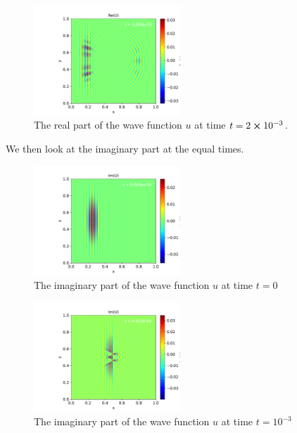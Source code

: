 \documentclass[english,notitlepage,reprint,nofootinbib]{revtex4-2}  %
\begin{document}
	\begin{figure}[h!]
		\centering
		\includegraphics[trim={1cm 0cm 1cm 0cm},clip,width=0.49\textwidth]{figures/problem8_U_Re_0.002.pdf}
		\caption{The real part of the wave function $u$ at time $t = 2\cross10^{-3}$.}
		\label{fig:prob8_Re2}
	\end{figure}
	We then look at the imaginary part at the equal times.
	\begin{figure}[h!]
		\centering
		\includegraphics[trim={1cm 0cm 1cm 0cm},clip,width=0.49\textwidth]{figures/problem8_U_Im_0.000.pdf}
		\caption{The imaginary part of the wave function $u$ at time $t = 0$}
		\label{fig:prob8_Im0}
	\end{figure}
	
	\begin{figure}[h!]
		\centering
		\includegraphics[trim={1cm 0cm 1cm 0cm},clip,width=0.49\textwidth]{figures/problem8_U_Im_0.001.pdf}
		\caption{The imaginary part of the wave function $u$ at time $t = 10^{-3}$}
		\label{fig:prob8_Im1}
	\end{figure}
	
\end{document}
